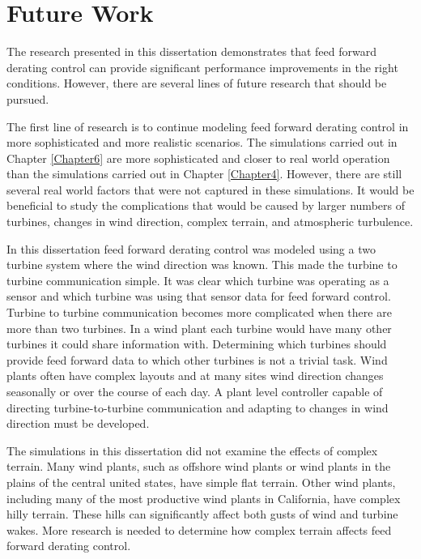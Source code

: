 
\section{Future Work}

The research presented in this dissertation demonstrates that feed forward derating control can provide significant performance improvements in the right conditions. However, there are several lines of future research that should be pursued. 

The first line of research is to continue modeling feed forward derating control in more sophisticated and more realistic scenarios. The simulations carried out in Chapter \ref{Chapter6} are more sophisticated and closer to real world operation than the simulations carried out in Chapter \ref{Chapter4}. However, there are still several real world factors that were not captured in these simulations. It would be beneficial  to study the complications that would be caused by larger numbers of turbines, changes in wind direction, complex terrain, and atmospheric turbulence.

In this dissertation feed forward derating control was modeled using a two turbine system where the wind direction was known. This made the turbine to turbine communication simple. It was clear which turbine was operating as a sensor and which turbine was using that sensor data for feed forward control. Turbine to turbine communication becomes more complicated when there are more than two turbines. In a wind plant each turbine would have many other turbines it could share information with. Determining which turbines should provide feed forward data to which other turbines is not a trivial task. Wind plants often have complex layouts and at many sites wind direction changes seasonally or over the course of each day. A plant level controller capable of directing turbine-to-turbine communication and adapting to changes in wind direction must be developed. 

The simulations in this dissertation did not examine the effects of complex terrain. Many wind plants, such as offshore wind plants or wind plants in the plains of the central united states, have simple flat terrain. Other wind plants, including many of the most productive wind plants in California, have complex hilly terrain. These hills can significantly affect both gusts of wind and turbine wakes. More research is needed to determine how complex terrain affects feed forward derating control. 

